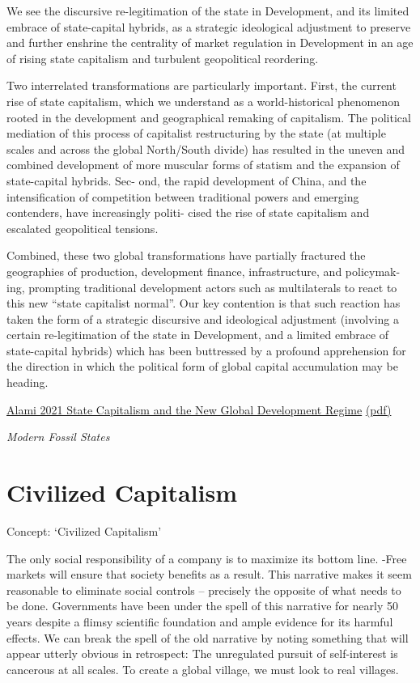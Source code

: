 \documentclass[
]{book}
\begin{document}
We see the discursive re-legitimation of the state in Development, and
its limited embrace of state-capital hybrids, as a
strategic ideological adjustment to preserve and further
enshrine the centrality of market regulation in Development in an age of rising
state capitalism and turbulent geopolitical reordering.

Two interrelated transformations
are particularly important. First, the current rise of state capitalism, which we
understand as a world-historical phenomenon rooted in the development and
geographical remaking of capitalism. The political mediation of this process of
capitalist restructuring by the state (at multiple scales and across the global
North/South divide) has resulted in the uneven and combined development of
more muscular forms of statism and the expansion of state-capital hybrids. Sec-
ond, the rapid development of China, and the intensification of competition
between traditional powers and emerging contenders, have increasingly politi-
cised the rise of state capitalism and escalated geopolitical tensions.

Combined, these two global transformations have partially fractured the
geographies of production, development finance, infrastructure, and policymak-
ing, prompting traditional development actors such as multilaterals to react to
this new ``state capitalist normal''. Our key contention is that such reaction has
taken the form of a strategic discursive and ideological adjustment (involving a
certain re-legitimation of the state in Development, and a limited embrace of
state-capital hybrids) which has been buttressed by a profound apprehension for
the direction in which the political form of global capital accumulation may be
heading.

\href{https://onlinelibrary.wiley.com/doi/epdf/10.1111/anti.12725}{Alami 2021 State Capitalism and the New Global Development Regime}
\href{Alami_2021_State_Capitalism_Development_Regime.pdf}{(pdf)}

\emph{Modern Fossil States}

\hypertarget{civilized-capitalism}{%
\section{Civilized Capitalism}\label{civilized-capitalism}}

Concept: `Civilized Capitalism'

The only social responsibility of a company is to maximize its bottom line.
-Free markets will ensure that society benefits as a result.
This narrative makes it seem reasonable to eliminate social controls --
precisely the opposite of what needs to be done.
Governments have been under the spell of this narrative for nearly 50 years despite a flimsy scientific foundation and ample evidence for its harmful effects. We can break the spell of the old narrative by noting something that will appear utterly obvious in retrospect: The unregulated pursuit of self-interest is cancerous at all scales. To create a global village, we must look to real villages.
\end{document}
